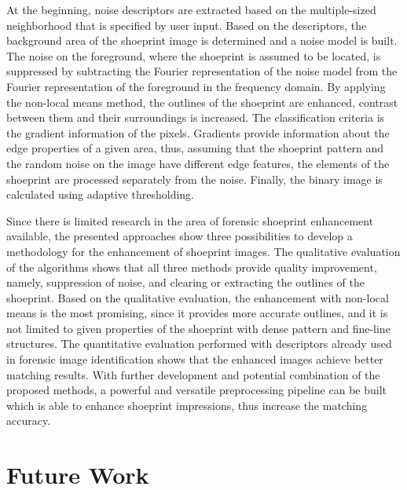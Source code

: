 \documentclass[draft,final]{vutinfth} %
\begin{document}
At the beginning, noise descriptors are extracted based on the multiple-sized neighborhood that is specified by user input.
Based on the descriptors, the background area of the shoeprint image is determined and a noise model is built.
The noise on the foreground, where the shoeprint is assumed to be located, is suppressed by subtracting the Fourier representation of the noise model from the Fourier representation of the foreground in the frequency domain.
By applying the non-local means method, the outlines of the shoeprint are enhanced, contrast between them and their surroundings is increased.
The classification criteria is the gradient information of the pixels.
Gradients provide information about the edge properties of a given area, thus, assuming that the shoeprint pattern and the random noise on the image have different edge features, the elements of the shoeprint are processed separately from the noise.
Finally, the binary image is calculated using adaptive thresholding.
\par
Since there is limited research in the area of forensic shoeprint enhancement available, the presented approaches show three possibilities to develop a methodology for the enhancement of shoeprint images.
The qualitative evaluation of the algorithms shows that all three methods provide quality improvement, namely, suppression of noise, and clearing or extracting the outlines of the shoeprint. 
Based on the qualitative evaluation, the enhancement with non-local means is the most promising, since it provides more accurate outlines, and it is not limited to given properties of the shoeprint with dense pattern and fine-line structures.
The quantitative evaluation performed with descriptors already used in forensic image identification shows that the enhanced images achieve better matching results.
With further development and potential combination of the proposed methods, a powerful and versatile preprocessing pipeline can be built which is able to enhance shoeprint impressions, thus increase the matching accuracy.

\section*{Future Work}
\end{document}
